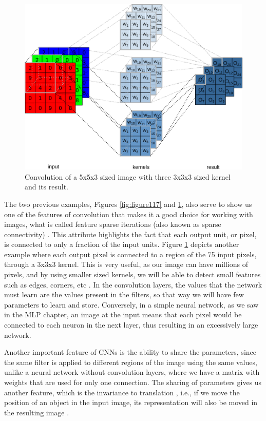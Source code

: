 \begin{figure}
    \centering
    \includegraphics[scale=0.25]{Part 3 - Learning Systems/Supervised Learning/Deep Learning/images/figure119.png}
    \caption{Convolution of a 5x5x3 sized image with three 3x3x3 sized kernel and its result.}
    \label{fig:figure119}
\end{figure}

The two previous examples, Figures \ref{fig:figure117} and \ref{fig:figure119}, also serve to show us one of the features of convolution that makes it a good choice for working with images, what is called feature sparse iterations (also known as sparse connectivity) \cite{goodfellow2016}. This attribute highlights the fact that each output unit, or pixel, is connected to only a fraction of the input units. Figure \ref{fig:figure119} depicts another example where each output pixel is connected to a region of the 75 input pixels, through a 3x3x3 kernel. This is very useful, as our image can have millions of pixels, and by using smaller sized kernels, we will be able to detect small features such as edges, corners, etc \cite{goodfellow2016}. In the convolution layers, the values that the network must learn are the values present in the filters, so that way we will have few parameters to learn and store. Conversely, in a simple neural network, as we saw in the MLP chapter, an image at the input means that each pixel would be connected to each neuron in the next layer, thus resulting in an excessively large network.

Another important feature of CNNs is the ability to share the parameters, since the same filter is applied to different regions of the image using the same values, unlike a neural network without convolution layers, where we have a matrix with weights that are used for only one connection. The sharing of parameters gives us another feature, which is the invariance to translation , i.e., if we move the position of an object in the input image, its representation will also be moved in the resulting image \cite{goodfellow2016}.

